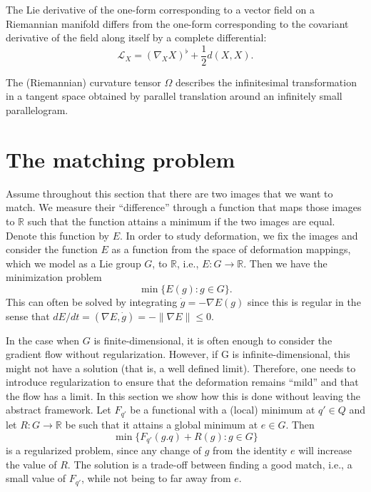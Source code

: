 \documentclass{article}
\theoremstyle{plain}
\theoremstyle{definition}
\numberwithin{equation}{section}
\newcommand{\R}{\ensuremath{\mathbb{R}}}
\newcommand{\lie}{\ensuremath{\mathcal{L}}}
\begin{document}
The Lie derivative of the one-form corresponding to a vector
field on a Riemannian manifold differs from the one-form corresponding to the
covariant derivative of the field along itself by a complete differential:
\[
\lie_X=(\nabla_X X)^\flat +\frac{1}{2}d(X,X).
\]

The (Riemannian) curvature tensor $\Omega$ describes the infinitesimal
transformation in a tangent space obtained by parallel translation around an
infinitely small parallelogram.







\section{The matching problem}
Assume throughout this section that there are two images that we want to match. We measure their ``difference'' through a function that maps those images to $\R$ such that the function attains a minimum if the two images are equal. Denote this function by $E$. In order to study deformation, we fix the images and consider the function $E$ as a function from the space of deformation mappings, which we model as a Lie group $G$, to $\R$, i.e., $E:G\to \R$. Then we have the minimization problem
\[
\min \{E(g):g\in G\}.
\]
This can often be solved by integrating $\dot{g}=-\nabla E(g)$ since this is regular in the sense that $dE/dt=(\nabla E,\dot{g})=-\|\nabla E\|\leq 0$.

In the case when $G$ is finite-dimensional, it is often enough to consider the
gradient flow without regularization. However, if G is infinite-dimensional, this might not have a solution (that is, a well defined limit). Therefore, one needs to introduce regularization to ensure that the deformation remains ``mild'' and that the flow has a limit. In this section we show how this is done without leaving the abstract framework. Let $F_{q'}$ be a functional with a (local) minimum at $q'\in Q$ and let $R:G\to \R$ be such that it attains a global minimum at $e\in G$. Then
\[
\min \{F_{q'}(g.q)+R(g):g\in G\}
\]
is a regularized problem, since any change of $g$ from the identity $e$ will increase the value of $R$. The solution is a trade-off between finding a good match, i.e., a small value of $F_{q'}$, while not being to far away from $e$.
\end{document}
